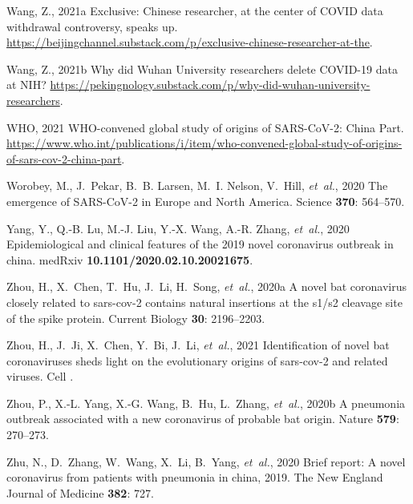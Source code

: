 \documentclass[9pt,twocolumn,twoside]{gsajnl_modified}
\begin{document}
\begin{thebibliography}{47}
{Wang, Z.}, 2021{a} {Exclusive: Chinese researcher, at the center of COVID data
  withdrawal controversy, speaks up}.
  \url{https://beijingchannel.substack.com/p/exclusive-chinese-researcher-at-the}.

{Wang, Z.}, 2021{b} {Why did Wuhan University researchers delete COVID-19 data
  at NIH?}
  \url{https://pekingnology.substack.com/p/why-did-wuhan-university-researchers}.

{{WHO}}, 2021 {WHO-convened global study of origins of SARS-CoV-2: China Part}.
  \url{https://www.who.int/publications/i/item/who-convened-global-study-of-origins-of-sars-cov-2-china-part}.

{Worobey, M., J.~Pekar, B.~B. Larsen, M.~I. Nelson, V.~Hill, {\em et~al.\/}},
  2020 {The emergence of SARS-CoV-2 in Europe and North America}. Science {\bf
  370}: 564--570.

{Yang, Y., Q.-B. Lu, M.-J. Liu, Y.-X. Wang, A.-R. Zhang, {\em et~al.\/}}, 2020
  Epidemiological and clinical features of the 2019 novel coronavirus outbreak
  in china. medRxiv {\bf 10.1101/2020.02.10.20021675}.

{Zhou, H., X.~Chen, T.~Hu, J.~Li, H.~Song, {\em et~al.\/}}, 2020{a} A novel bat
  coronavirus closely related to sars-cov-2 contains natural insertions at the
  s1/s2 cleavage site of the spike protein. Current Biology {\bf 30}:
  2196--2203.

{Zhou, H., J.~Ji, X.~Chen, Y.~Bi, J.~Li, {\em et~al.\/}}, 2021 Identification
  of novel bat coronaviruses sheds light on the evolutionary origins of
  sars-cov-2 and related viruses. Cell .

{Zhou, P., X.-L. Yang, X.-G. Wang, B.~Hu, L.~Zhang, {\em et~al.\/}}, 2020{b} A
  pneumonia outbreak associated with a new coronavirus of probable bat origin.
  Nature {\bf 579}: 270--273.

{Zhu, N., D.~Zhang, W.~Wang, X.~Li, B.~Yang, {\em et~al.\/}}, 2020 Brief
  report: A novel coronavirus from patients with pneumonia in china, 2019. The
  New England Journal of Medicine {\bf 382}: 727.

\end{thebibliography}
\end{document}

